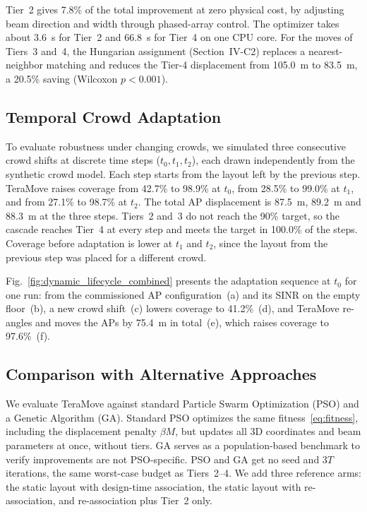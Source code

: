\documentclass[conference]{IEEEtran}
\begin{document}
	Tier~2 gives 7.8\% of the total improvement at zero physical cost, by adjusting beam direction and width through phased-array control. The optimizer takes about 3.6~s for Tier~2 and 66.8~s for Tier~4 on one CPU core. For the moves of Tiers~3 and~4, the Hungarian assignment (Section~IV-C2) replaces a nearest-neighbor matching and reduces the Tier-4 displacement from 105.0~m to 83.5~m, a 20.5\% saving (Wilcoxon $p <0.001$).

	\subsection{Temporal Crowd Adaptation}

	To evaluate robustness under changing crowds, we simulated three consecutive crowd shifts at discrete time steps ($t_0, t_1, t_2$), each drawn independently from the synthetic crowd model. Each step starts from the layout left by the previous step. TeraMove raises coverage from 42.7\% to 98.9\% at $t_0$, from 28.5\% to 99.0\% at $t_1$, and from 27.1\% to 98.7\% at $t_2$. The total AP displacement is 87.5~m, 89.2~m and 88.3~m at the three steps. Tiers~2 and~3 do not reach the 90\% target, so the cascade reaches Tier~4 at every step and meets the target in 100.0\% of the steps. Coverage before adaptation is lower at $t_1$ and $t_2$, since the layout from the previous step was placed for a different crowd.

	Fig.~\ref{fig:dynamic_lifecycle_combined} presents the adaptation sequence at $t_{0}$ for one run: from the commissioned AP configuration~(a) and its SINR on the empty floor~(b), a new crowd shift~(c) lowers coverage to 41.2\%~(d), and TeraMove re-angles and moves the APs by 75.4~m in total~(e), which raises coverage to 97.6\%~(f).

	\subsection{Comparison with Alternative Approaches}

	We evaluate TeraMove against standard Particle Swarm Optimization (PSO) and a Genetic Algorithm (GA). Standard PSO optimizes the same fitness~\eqref{eq:fitness}, including the displacement penalty $\beta M$, but updates all 3D coordinates and beam parameters at once, without tiers. GA serves as a population-based benchmark to verify improvements are not PSO-specific. PSO and GA get no seed and $3T$ iterations, the same worst-case budget as Tiers~2--4. We add three reference arms: the static layout with design-time association, the static layout with re-association, and re-association plus Tier~2 only.
\end{document}
